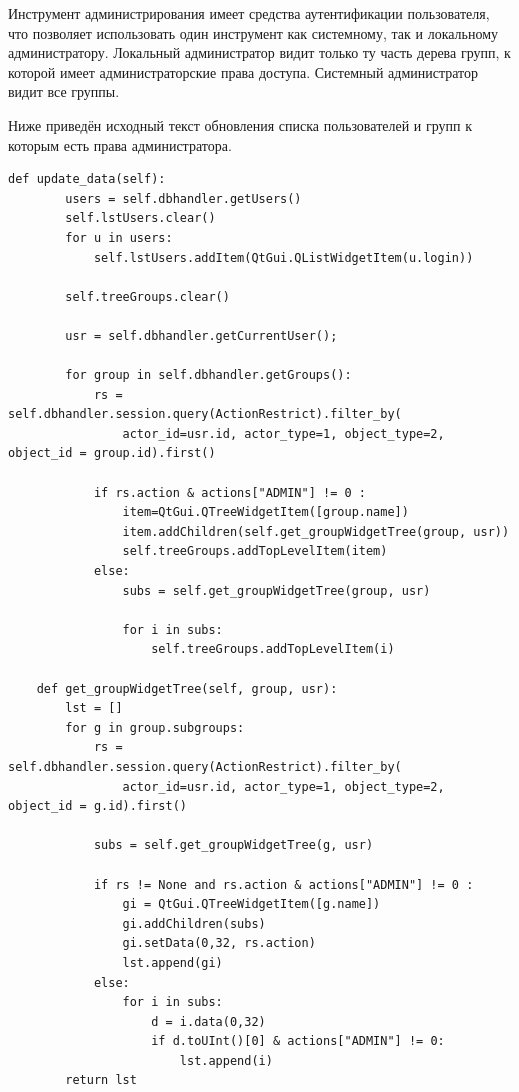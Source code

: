 \documentclass[utf8,usehyperref,12pt]{G7-32}
\begin{document}
 
Инструмент администрирования имеет средства аутентификации пользователя, что позволяет использовать один инструмент как системному, так и локальному администратору. Локальный администратор видит только ту часть дерева групп, к которой имеет администраторские права доступа. Системный администратор видит все группы.

Ниже приведён исходный текст обновления списка пользователей и групп к которым есть права администратора. 

\begin{verbatim}
def update_data(self):
        users = self.dbhandler.getUsers()
        self.lstUsers.clear()
        for u in users:
            self.lstUsers.addItem(QtGui.QListWidgetItem(u.login))                
        
        self.treeGroups.clear()
        
        usr = self.dbhandler.getCurrentUser();
        
        for group in self.dbhandler.getGroups():            
            rs = self.dbhandler.session.query(ActionRestrict).filter_by(
            	actor_id=usr.id, actor_type=1, object_type=2, object_id = group.id).first()
            	
            if rs.action & actions["ADMIN"] != 0 :
                item=QtGui.QTreeWidgetItem([group.name])
                item.addChildren(self.get_groupWidgetTree(group, usr))
                self.treeGroups.addTopLevelItem(item)
            else:
                subs = self.get_groupWidgetTree(group, usr)
                
                for i in subs:
                    self.treeGroups.addTopLevelItem(i)
        
    def get_groupWidgetTree(self, group, usr):        
        lst = []
        for g in group.subgroups:
            rs = self.dbhandler.session.query(ActionRestrict).filter_by(
	            actor_id=usr.id, actor_type=1, object_type=2, object_id = g.id).first()
	            
            subs = self.get_groupWidgetTree(g, usr)
            
            if rs != None and rs.action & actions["ADMIN"] != 0 :
                gi = QtGui.QTreeWidgetItem([g.name])
                gi.addChildren(subs)
                gi.setData(0,32, rs.action)
                lst.append(gi)
            else:                
                for i in subs:
                    d = i.data(0,32)
                    if d.toUInt()[0] & actions["ADMIN"] != 0:
                        lst.append(i)                
        return lst
\end{verbatim}
\end{document}
